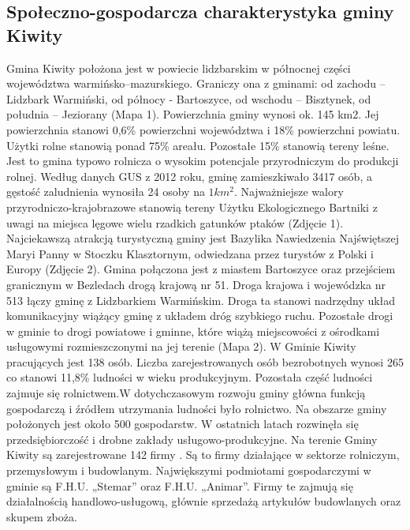 \documentclass[a4paper,10pt]{article}
\begin{document}
  \subsection{Społeczno-gospodarcza charakterystyka gminy Kiwity}
    Gmina Kiwity położona jest w powiecie lidzbarskim w północnej części  województwa warmińsko–mazurskiego. 
    Graniczy ona z gminami: od zachodu –Lidzbark Warmiński, od północy - Bartoszyce, od wschodu – Bisztynek, od południa – Jeziorany (Mapa 1).
    Powierzchnia gminy wynosi ok. 145 km2. Jej powierzchnia stanowi 0,6\% powierzchni województwa i 18\% powierzchni powiatu. Użytki rolne stanowią ponad 75\% areału. 
    Pozostałe 15\% stanowią tereny leśne. Jest to gmina typowo rolnicza o wysokim potencjale przyrodniczym do produkcji rolnej.
    Według danych GUS z 2012 roku, gminę zamieszkiwało 3417 osób, a gęstość zaludnienia wynosiła 24 osoby na $1 km^{2}$.
    Najważniejsze walory przyrodniczo-krajobrazowe stanowią tereny Użytku Ekologicznego Bartniki z uwagi na miejsca lęgowe wielu rzadkich gatunków ptaków (Zdjęcie 1).
    Najciekawszą atrakcją turystyczną gminy jest Bazylika Nawiedzenia Najświętszej Maryi Panny w Stoczku Klasztornym, odwiedzana przez turystów z Polski i Europy (Zdjęcie 2).
    Gmina połączona jest z miastem Bartoszyce oraz przejściem granicznym w Bezledach drogą krajową nr 51. 
    Droga krajowa i  wojewódzka nr 513 łączy gminę z Lidzbarkiem Warmińskim. Droga ta stanowi nadrzędny układ komunikacyjny wiążący gminę z układem dróg szybkiego ruchu. 
    Pozostałe drogi w gminie to drogi powiatowe i gminne, które wiążą miejscowości z ośrodkami usługowymi rozmieszczonymi na jej terenie (Mapa 2).
    W Gminie Kiwity pracujących jest 138 osób. Liczba zarejestrowanych osób bezrobotnych wynosi 265 co stanowi 11,8\% ludności w wieku produkcyjnym. 
    Pozostała część ludności zajmuje się rolnictwem.W dotychczasowym rozwoju gminy główna funkcją gospodarczą i źródłem utrzymania ludności było rolnictwo. 
    Na obszarze gminy położonych jest około 500 gospodarstw. W ostatnich latach rozwinęła się przedsiębiorczość i drobne zakłady usługowo-produkcyjne. 
    Na terenie Gminy Kiwity są zarejestrowane 142 firmy . Są to firmy działające w sektorze rolniczym, przemysłowym i budowlanym. 
    Największymi podmiotami gospodarczymi w gminie są F.H.U. „Stemar” oraz F.H.U. „Animar”. 
    Firmy te zajmują się działalnością handlowo-usługową, głównie sprzedażą artykułów budowlanych oraz skupem zboża.
\end{document}
